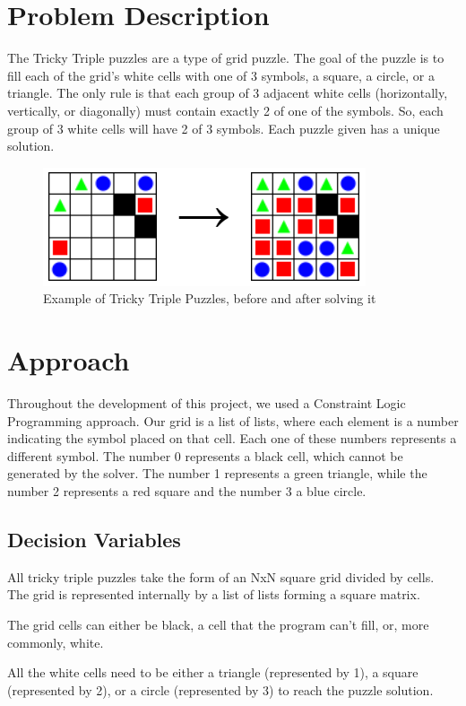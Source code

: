 \documentclass[runningheads]{llncs}
\begin{document}
\section{Problem Description}
The Tricky Triple puzzles are a type of grid puzzle.
The goal of the puzzle is to fill each of the grid’s white cells with one of 3 symbols,
a square, a circle, or a triangle.
The only rule is that each group of 3 adjacent white cells
    (horizontally, vertically, or diagonally) must contain exactly 2 of one of the symbols.
So, each group of 3 white cells will have 2 of 3 symbols.
Each puzzle given has a unique solution.

\begin{figure}
    \centering
    \includegraphics[scale=0.7]{img/tricky-triple.png}
    \caption{Example of Tricky Triple Puzzles, before and after solving it} \label{fig1}
\end{figure}

\section{Approach}
Throughout the development of this project, we used a Constraint Logic Programming approach.
Our grid is a list of lists, where each element is a number indicating the symbol placed on that cell.
Each one of these numbers represents a different symbol.
The number 0 represents a black cell, which cannot be generated by the solver.
The number 1 represents a green triangle,
    while the number 2 represents a red square and the number 3 a blue circle.

\subsection{Decision Variables}
All tricky triple puzzles take the form of an NxN square grid divided by cells.
The grid is represented internally by a list of lists forming a square matrix.

The grid cells can either be black, a cell that the program can't fill, or, more commonly, white.

All the white cells need to be either a triangle (represented by 1), a square (represented by 2),
    or a circle (represented by 3) to reach the puzzle solution.
\end{document}
